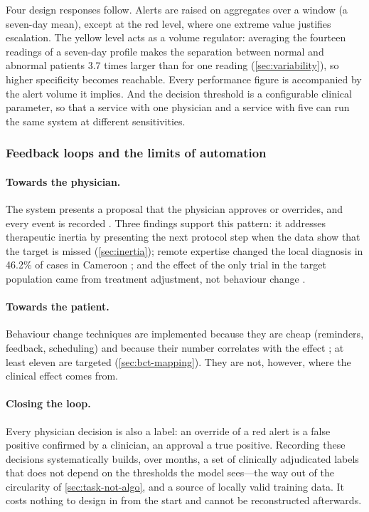Four design responses follow. Alerts are raised on aggregates over a window (a seven-day mean), except at the red level, where one extreme value justifies escalation. The yellow level acts as a volume regulator: averaging the fourteen readings of a seven-day profile makes the separation between normal and abnormal patients 3.7 times larger than for one reading (\cref{sec:variability}), so higher specificity becomes reachable. Every performance figure is accompanied by the alert volume it implies. And the decision threshold is a configurable clinical parameter, so that a service with one physician and a service with five can run the same system at different sensitivities.

\subsubsection{Feedback loops and the limits of automation}\label{sec:feedback}\label{sec:closed-loop}\label{sec:safety}

\paragraph{Towards the physician.} The system presents a proposal that the physician approves or overrides, and every event is recorded \parencite{yazdani2018}. Three findings support this pattern: it addresses therapeutic inertia by presenting the next protocol step when the data show that the target is missed (\cref{sec:inertia}); remote expertise changed the local diagnosis in 46.2\% of cases in Cameroon \parencite{bediang2021}; and the effect of the only trial in the target population came from treatment adjustment, not behaviour change \parencite{mihevc2025}.

\paragraph{Towards the patient.} Behaviour change techniques are implemented because they are cheap (reminders, feedback, scheduling) and because their number correlates with the effect \parencite{zhou2024}; at least eleven are targeted (\cref{sec:bct-mapping}). They are not, however, where the clinical effect comes from.

\paragraph{Closing the loop.} Every physician decision is also a label: an override of a red alert is a false positive confirmed by a clinician, an approval a true positive. Recording these decisions systematically builds, over months, a set of clinically adjudicated labels that does not depend on the thresholds the model sees---the way out of the circularity of \cref{sec:task-not-algo}, and a source of locally valid training data. It costs nothing to design in from the start and cannot be reconstructed afterwards.

